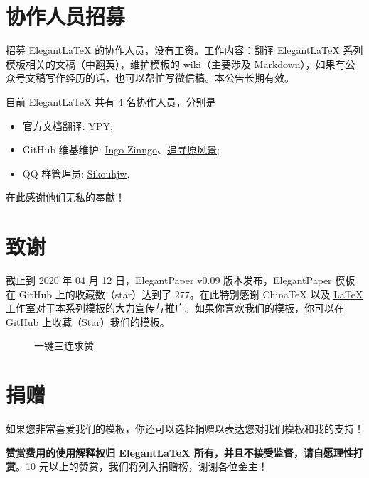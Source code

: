 \documentclass[lang=cn,11pt,a4paper,cite=authoryear]{elegantpaper}
\begin{document}
\section{协作人员招募}
招募 Elegant\LaTeX{} 的协作人员，没有工资。工作内容：翻译 Elegant\LaTeX{} 系列模板相关的文稿（中翻英），维护模板的 wiki（主要涉及 Markdown），如果有公众号文稿写作经历的话，也可以帮忙写微信稿。本公告长期有效。

目前 ElegantLaTeX 共有 4 名协作人员，分别是
\begin{itemize}
  \item 官方文档翻译: \href{https://github.com/peggy2006xzyz}{YPY};
  \item GitHub 维基维护: \href{https://github.com/izinngo}{Ingo Zinngo}、\href{https://github.com/xiaohao890809}{追寻原风景};
  \item QQ 群管理员: \href{https://github.com/sikouhjw}{Sikouhjw}.
\end{itemize}

在此感谢他们无私的奉献！


\section{致谢}
截止到 2020 年 04 月 12 日，ElegantPaper v0.09 版本发布，ElegantPaper 模板在 GitHub 上的收藏数（star）达到了 277。在此特别感谢 China\TeX{} 以及 \href{http://www.latexstudio.net/}{\LaTeX{} 工作室}对于本系列模板的大力宣传与推广。如果你喜欢我们的模板，你可以在 GitHub 上收藏（Star）我们的模板。
\begin{figure}[htbp]
  \centering

  \caption{一键三连求赞}
\end{figure}

\section{捐赠}
如果您非常喜爱我们的模板，你还可以选择捐赠以表达您对我们模板和我的支持！

\begin{figure}[htbp]
  \centering

\end{figure}

\textbf{赞赏费用的使用解释权归 Elegant\LaTeX{} 所有，并且不接受监督，请自愿理性打赏}。10 元以上的赞赏，我们将列入捐赠榜，谢谢各位金主！
\end{document}
